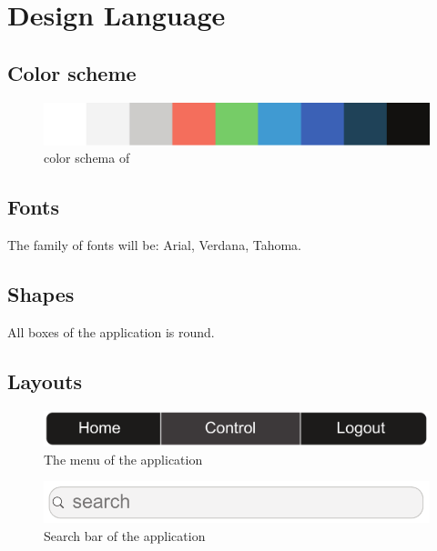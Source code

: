 \section{Design Language}

\subsection{Color scheme}

\begin{figure}[htb]
    \centering
    \includegraphics[width=\textwidth]{gfx/color_schema.pdf}
    \caption{color schema of \projectname{}}
    \label{fig:color_schema}
\end{figure}

\subsection{Fonts}

The family of fonts will be: Arial, Verdana, Tahoma.

\subsection{Shapes}

All boxes of the application is round.

\subsection{Layouts}

\begin{figure}[htb]
    \centering
    \includegraphics[width=\textwidth]{gfx/menu.pdf}
    \caption{The menu of the application}
    \label{fig:menu_design}
\end{figure}

\begin{figure}[htb]
    \centering
    \includegraphics[width=\textwidth]{gfx/search.pdf}
    \caption{Search bar of the application}
    \label{fig:search_bar_design}
\end{figure}

